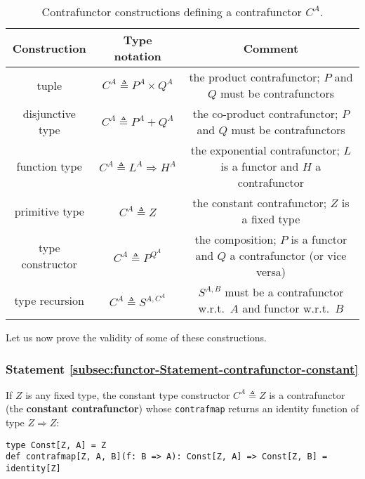\begin{table}
\begin{centering}
\begin{tabular}{|c|c|c|}
\hline 
\textbf{\small{}Construction} & \textbf{\small{}Type notation} & \textbf{\small{}Comment}\tabularnewline
\hline 
\hline 
{\footnotesize{}tuple} & {\footnotesize{}$C^{A}\triangleq P^{A}\times Q^{A}$} & {\footnotesize{}the product contrafunctor; $P$ and $Q$ must be contrafunctors}\tabularnewline
\hline 
{\footnotesize{}disjunctive type} & {\footnotesize{}$C^{A}\triangleq P^{A}+Q^{A}$} & {\footnotesize{}the co-product contrafunctor; $P$ and $Q$ must be
contrafunctors}\tabularnewline
\hline 
{\footnotesize{}function type} & {\footnotesize{}$C^{A}\triangleq L^{A}\Rightarrow H^{A}$} & {\footnotesize{}the exponential contrafunctor; $L$ is a functor and
$H$ a contrafunctor}\tabularnewline
\hline 
{\footnotesize{}primitive type} & {\footnotesize{}$C^{A}\triangleq Z$} & {\footnotesize{}the constant contrafunctor; $Z$ is a fixed type}\tabularnewline
\hline 
{\footnotesize{}type constructor} & {\footnotesize{}$C^{A}\triangleq P^{Q^{A}}$} & {\footnotesize{}the composition; $P$ is a functor and $Q$ a contrafunctor
(or vice versa)}\tabularnewline
\hline 
{\footnotesize{}type recursion} & {\footnotesize{}$C^{A}\triangleq S^{A,C^{A}}$} & {\footnotesize{}$S^{A,B}$ must be a contrafunctor w.r.t.~$A$ and
functor w.r.t.~$B$}\tabularnewline
\hline 
\end{tabular}
\par\end{centering}
\caption{Contrafunctor constructions defining a contrafunctor $C^{A}$.\label{tab:f-Contrafunctor-constructions}}
\end{table}

Let us now prove the validity of some of these constructions.

\subsubsection{Statement \label{subsec:functor-Statement-contrafunctor-constant}\ref{subsec:functor-Statement-contrafunctor-constant}}

If $Z$ is any fixed type, the constant type constructor $C^{A}\triangleq Z$
is a contrafunctor (the \textbf{constant contrafunctor})
whose \lstinline!contrafmap! returns an identity function of type
$Z\Rightarrow Z$:
\begin{lstlisting}
type Const[Z, A] = Z
def contrafmap[Z, A, B](f: B => A): Const[Z, A] => Const[Z, B] = identity[Z] 
\end{lstlisting}


